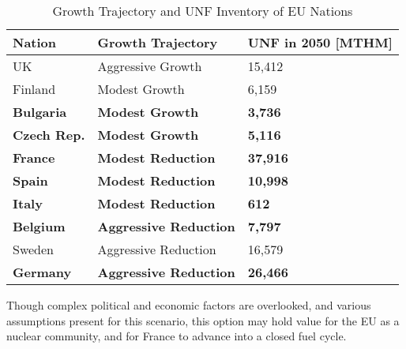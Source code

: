 \begin{table}[h]
\centering
    \begin{adjustbox}{max totalsize={1.1\textwidth}{.8\textheight}, center}
                \begin{tabularx}{\textwidth}{lbb}
                    \hline 
                    
                    \textbf{Nation} & \textbf{Growth Trajectory} & \small{\textbf{UNF in 2050 [MTHM] }}\\
                    \hline
                    UK & Aggressive Growth & 15,412\\
                    \hline
                    Finland & Modest Growth & 6,159\\
                    \hline
                    \textbf{Bulgaria} & \textbf{Modest Growth} & \textbf{3,736}\\
                    \hline
                    \textbf{Czech Rep.} & \textbf{Modest Growth} & \textbf{5,116}\\
                    \hline
                    \textbf{France} & \textbf{Modest Reduction} & \textbf{37,916}\\
                    \hline
                    \textbf{Spain} & \textbf{Modest Reduction} &  \textbf{10,998}\\
                    \hline
                    \textbf{Italy} & \textbf{Modest Reduction} & \textbf{612}\\
                    \hline
                    \textbf{Belgium} & \textbf{Aggressive Reduction} & \textbf{7,797}\\
                    \hline
                    Sweden & Aggressive Reduction & 16,579\\
                    \hline
                    \textbf{Germany} & \textbf{Aggressive Reduction} & \textbf{26,466}\\
                    \hline
                    
                \end{tabularx}
    \end{adjustbox}
    \caption {Growth Trajectory and UNF Inventory of \gls{EU} Nations}
    \label{tab:which_count}
\end{table}



Though complex political and economic factors are overlooked,
 and various assumptions present for this scenario,
this option may hold value for the \gls{EU} as a nuclear community,
and for France to advance into a closed fuel cycle.
